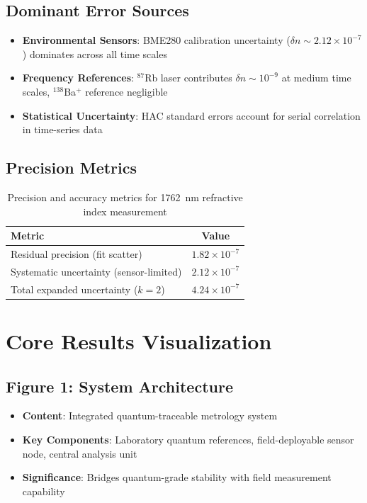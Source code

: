 \documentclass[aip,reprint,groupedaddress,onecolumn,superscriptaddress]{revtex4-2}
\begin{document}
\subsection{Dominant Error Sources}
\begin{itemize}
    \item \textbf{Environmental Sensors}: BME280 calibration uncertainty ($\delta n \sim 2.12\times10^{-7}$) dominates across all time scales
    \item \textbf{Frequency References}: $^{87}$Rb laser contributes $\delta n \sim 10^{-9}$ at medium time scales, $^{138}$Ba$^+$ reference negligible
    \item \textbf{Statistical Uncertainty}: HAC standard errors account for serial correlation in time-series data
\end{itemize}

\subsection{Precision Metrics}
\begin{table}[ht]
\centering
\caption{Precision and accuracy metrics for \SI{1762}{\nano\meter} refractive index measurement}
\begin{tabular}{lc}
\toprule
\textbf{Metric} & \textbf{Value} \\
\midrule
Residual precision (fit scatter) & $1.82 \times 10^{-7}$ \\
Systematic uncertainty (sensor-limited) & $2.12 \times 10^{-7}$ \\
Total expanded uncertainty ($k=2$) & $4.24 \times 10^{-7}$ \\
\bottomrule
\end{tabular}
\label{tab:precision_metrics}
\end{table}

\section{Core Results Visualization}

\subsection{Figure 1: System Architecture}
\begin{itemize}
    \item \textbf{Content}: Integrated quantum-traceable metrology system
    \item \textbf{Key Components}: Laboratory quantum references, field-deployable sensor node, central analysis unit
    \item \textbf{Significance}: Bridges quantum-grade stability with field measurement capability
\end{itemize}
\end{document}
